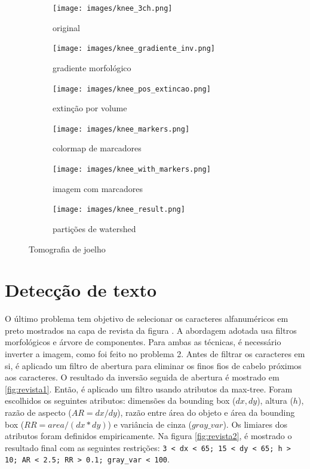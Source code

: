 \documentclass{article}
\begin{document}
\begin{figure}[H]
	\centering
	\begin{subfigure}{.3\textwidth}
		\texttt{[image: images/knee\_3ch.png]}
		\caption{original}
		\label{fig:knee0}
	\end{subfigure}
	\begin{subfigure}{.3\textwidth}
		\texttt{[image: images/knee\_gradiente\_inv.png]}
		\caption{gradiente morfológico}
		\label{fig:knee1}
	\end{subfigure}
	\begin{subfigure}{.3\textwidth}
		\texttt{[image: images/knee\_pos\_extincao.png]}
		\caption{extinção por volume}
		\label{fig:knee2}
	\end{subfigure}
	\begin{subfigure}{.3\textwidth}
		\texttt{[image: images/knee\_markers.png]}
		\caption{colormap de marcadores}
		\label{fig:knee3}
	\end{subfigure}
	\begin{subfigure}{.3\textwidth}
		\texttt{[image: images/knee\_with\_markers.png]}
		\caption{imagem com marcadores}
		\label{fig:knee3}
	\end{subfigure}
	\begin{subfigure}{.3\textwidth}
		\texttt{[image: images/knee\_result.png]}
		\caption{partições de watershed}
		\label{fig:knee3}
	\end{subfigure}
	\caption{Tomografia de joelho}
	\label{fig:knee}
\end{figure}

\section{Detecção de texto}
O último problema tem objetivo de selecionar os caracteres alfanuméricos em preto mostrados na capa de revista da figura \label{revista0}. A abordagem adotada usa filtros morfológicos e árvore de componentes. Para ambas as técnicas, é necessário inverter a imagem, como foi feito no problema 2. Antes de filtrar os caracteres em si, é aplicado um filtro de abertura para eliminar os finos fios de cabelo próximos aos caracteres. O resultado da inversão seguida de abertura é mostrado em \ref{fig:revista1}. Então, é aplicado um filtro usando atributos da max-tree. Foram escolhidos os seguintes atributos: dimensões da bounding box ($dx, dy$), altura ($h$), razão de aspecto ($AR = dx/dy$), razão entre área do objeto e área da bounding box ($RR = area/(dx*dy)$) e variância de cinza ($gray\_var$). Os limiares dos atributos foram definidos empiricamente. Na figura \ref{fig:revista2}, é mostrado o resultado final com as seguintes restrições: \texttt{3 < dx < 65; 15 < dy < 65; h > 10; AR < 2.5; RR > 0.1; gray\_var < 100}.
\end{document}

